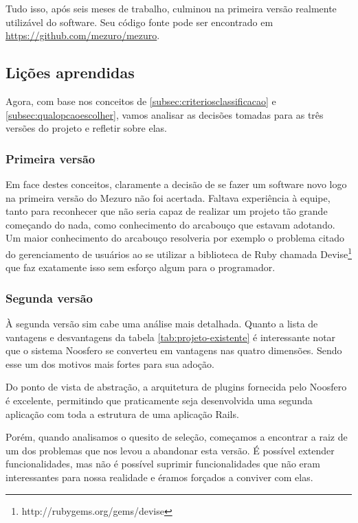 \documentclass[12pt]{article}
\begin{document}
  Tudo isso, após seis meses de trabalho, culminou na primeira versão realmente utilizável do software. Seu código fonte pode ser encontrado em \url{https://github.com/mezuro/mezuro}.

  \subsection{Lições aprendidas} \label{subsec:licoes-aprendidas}
  Agora, com base nos conceitos de \ref{subsec:criteriosclassificacao} e \ref{subsec:qualopcaoescolher}, vamos analisar as decisões tomadas para as três versões do projeto e refletir sobre elas.

    \subsubsection{Primeira versão}
    Em face destes conceitos, claramente a decisão de se fazer um software novo logo na primeira versão do Mezuro não foi acertada. Faltava experiência à equipe, tanto para reconhecer que não seria capaz de realizar um projeto tão grande começando do nada, como conhecimento do arcabouço que estavam adotando. Um maior conhecimento do arcabouço resolveria por exemplo o problema citado do gerenciamento de usuários ao se utilizar a biblioteca de Ruby chamada Devise\footnote{http://rubygems.org/gems/devise} que faz exatamente isso sem esforço algum para o programador.

    \subsubsection{Segunda versão} \label{subsubsec:segundaversao}
    À segunda versão sim cabe uma análise mais detalhada. Quanto a lista de vantagens e desvantagens da tabela \ref{tab:projeto-existente} é interessante notar que o sistema Noosfero se converteu em vantagens nas quatro dimensões. Sendo esse um dos motivos mais fortes para sua adoção.

    Do ponto de vista de abstração, a arquitetura de plugins fornecida pelo Noosfero é excelente, permitindo que praticamente seja desenvolvida uma segunda aplicação com toda a estrutura de uma aplicação Rails.

    Porém, quando analisamos o quesito de seleção, começamos a encontrar a raiz de um dos problemas que nos levou a abandonar esta versão. É possível extender funcionalidades, mas não é possível suprimir funcionalidades que não eram interessantes para nossa realidade e éramos forçados a conviver com elas.
\end{document}
